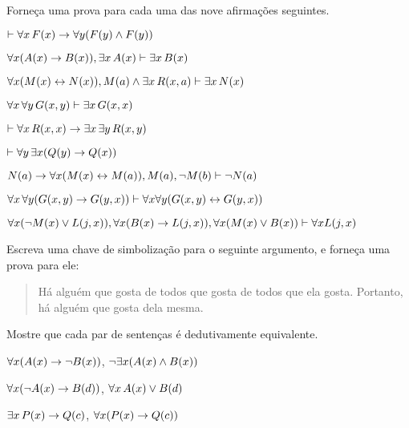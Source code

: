\problempart
\label{pr.someFOLproofs}
Forneça uma prova para cada uma das nove afirmações seguintes. 
\begin{earg}
\item $\vdash \forall x\,\mathord{F}(x) \rightarrow \forall y(\mathord{F}(y) \wedge \mathord{F}(y))$
\item $\forall x(\mathord{A}(x)\rightarrow \mathord{B}(x)), \exists x\,\mathord{A}(x) \vdash \exists x\,\mathord{B}(x)$
\item $\forall x(\mathord{M}(x) \leftrightarrow \mathord{N}(x)), \mathord{M}(a) \wedge \exists x\,\mathord{R}(x,a) \vdash \exists x\,\mathord{N}(x)$
\item $\forall x\, \forall y\,\mathord{G}(x,y)\vdash\exists x\,\mathord{G}(x,x)$
\item $\vdash\forall x\,\mathord{R}(x,x) \rightarrow \exists x\, \exists y\,\mathord{R}(x,y)$
\item $\vdash\forall y\, \exists x (\mathord{Q}(y) \rightarrow \mathord{Q}(x))$
\item $\mathord{N}(a) \rightarrow \forall x(\mathord{M}(x) \leftrightarrow \mathord{M}(a)), \mathord{M}(a), \neg\mathord{M}(b)\vdash \neg \mathord{N}(a)$
\item $\forall x\, \forall y (\mathord{G}(x,y) \rightarrow \mathord{G}(y,x)) \vdash \forall x\forall y (\mathord{G}(x,y) \leftrightarrow \mathord{G}(y,x))$
\item $\forall x(\neg\mathord{M}(x) \vee \mathord{L}(j,x)), \forall x(\mathord{B}(x)\rightarrow \mathord{L}(j,x)), \forall x(\mathord{M}(x)\vee \mathord{B}(x))\vdash \forall x\mathord{L}(j,x)$
\end{earg}
 
\solutions
\problempart
\label{pr.likes}
Escreva uma chave de simbolização para o seguinte argumento, e forneça uma prova para ele:
\begin{quote}
Há alguém que gosta de todos que gosta de todos que ela gosta. Portanto, há alguém que gosta dela mesma.
\end{quote}


\problempart
Mostre que cada par de sentenças é dedutivamente equivalente.
\begin{earg}
\item $\forall x (\mathord{A}(x)\rightarrow \neg \mathord{B}(x))$, $\neg\exists x(\mathord{A}(x) \wedge \mathord{B}(x))$
\item $\forall x (\neg\mathord{A}(x)\rightarrow \mathord{B}(d))$, $\forall x\,\mathord{A}(x) \vee \mathord{B}(d)$
\item $\exists x\,\mathord{P}(x) \rightarrow \mathord{Q}(c)$, $\forall x (\mathord{P}(x) \rightarrow \mathord{Q}(c))$
\end{earg}

